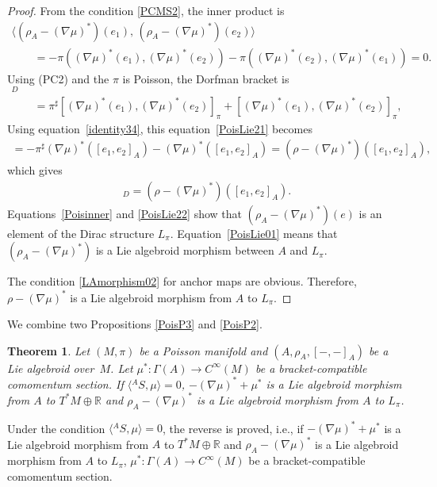 \documentclass[10pt,a4paper]{amsart}
\numberwithin{equation}{section}
\newtheorem{Theorem}{Theorem}[section]
\def\bR{{\mathbb{R}}}
\newcommand{\rhoa}{{\rho_A}}
\newcommand{\bracket}[2]{\langle #1,\,#2\rangle}
\begin{document}
\begin{proof}
From the condition \eqref{PCMS2}, the inner product is
\begin{gather}
 \bracket{(\rhoa - (\nabla \mu)^*)(e_1)}{(\rhoa - (\nabla \mu)^*)(e_2)}
\nonumber \\
\qquad= - \pi((\nabla \mu)^*(e_1), (\nabla \mu)^*(e_2))
- \pi((\nabla \mu)^*(e_2), (\nabla \mu)^*(e_1)) =0.
\label{Poisinner}
\end{gather}
Using (PC2) and the $\pi$ is Poisson, the Dorfman bracket is
\begin{gather}
[(\rhoa - (\nabla \mu)^*)(e_1), (\rhoa - (\nabla \mu)^*)(e_2)]_D\nonumber\\
\qquad= \pi^{\sharp}[(\nabla \mu)^*(e_1), (\nabla \mu)^*(e_2)]_{\pi}
+ [(\nabla \mu)^*(e_1), (\nabla \mu)^*(e_2)]_{\pi},
\label{PoisLie21}
\end{gather}
Using equation~\eqref{identity34}, this equation~\eqref{PoisLie21}
becomes
\begin{gather}
= - \pi^{\sharp} (\nabla \mu)^*([e_1, e_2]_A)
- (\nabla \mu)^*([e_1, e_2]_A)
= (\rho - (\nabla \mu)^*)([e_1, e_2]_A),
\label{PoisLie22}
\end{gather}
which gives
\begin{gather}
[(\rhoa - (\nabla \mu)^*)(e_1), (\rhoa - (\nabla \mu)^*)(e_2)]_D
= (\rho - (\nabla \mu)^*)([e_1, e_2]_A).
\label{PoisLie01}
\end{gather}
Equations~\eqref{Poisinner} and \eqref{PoisLie22} show that
$(\rhoa - (\nabla \mu)^*)(e)$ is an element of the Dirac structure
$L_{\pi}$.
Equation~\eqref{PoisLie01} means that $(\rhoa - (\nabla \mu)^*)$ is
a Lie algebroid morphism between $A$ and $L_{\pi}$.

The condition \eqref{LAmorphism02} for anchor maps are obvious.
Therefore, $\rho - (\nabla \mu)^*$ is a Lie algebroid morphism
from $A$ to $L_{\pi}$.
\end{proof}


We combine two Propositions \ref{PoisP3} and \ref{PoisP2}.
\begin{Theorem}
Let $(M, \pi)$ be a Poisson manifold and $(A, \rhoa, [-,-]_A)$ be a Lie algebroid over~$M$.
Let $\mu^*\colon \Gamma(A) \rightarrow C^{\infty}(M)$ be a bracket-compatible comomentum section. If $\bigl\langle {}^A S,\mu\bigr\rangle = 0$,
$-(\nabla \mu)^* + \mu^*$ is a Lie algebroid morphism from
$A$ to $T^*M \oplus \bR$ and
$\rhoa - (\nabla \mu)^*$ is a Lie algebroid morphism
from $A$ to $L_{\pi}$.
\end{Theorem}
Under the condition $\bigl\langle {}^A S,\mu\bigr\rangle = 0$,
the reverse is proved, i.e.,
if $-(\nabla \mu)^* + \mu^*$ is a Lie algebroid morphism from
$A$ to $T^*M \oplus \bR$ and
$\rhoa - (\nabla \mu)^*$ is a Lie algebroid morphism
from $A$ to $L_{\pi}$,
$\mu^*\colon \Gamma(A) \rightarrow C^{\infty}(M)$ be a bracket-compatible comomentum section.
\end{document}
